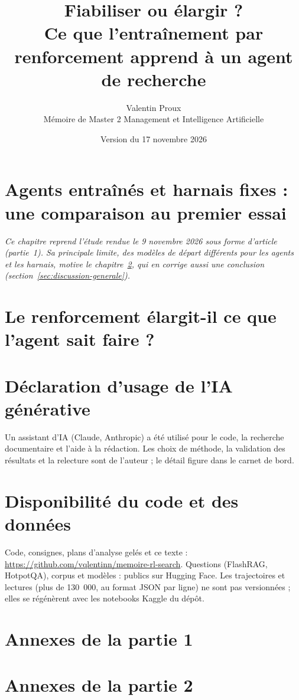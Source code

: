 \documentclass[11pt,a4paper]{report}
\title{\textbf{Fiabiliser ou élargir ?}\\[6pt]
\Large Ce que l'entraînement par renforcement apprend à un agent de recherche}
\author{Valentin Proux\\[4pt]\normalsize Mémoire de Master 2 Management et Intelligence Artificielle}
\date{Version du 17 novembre 2026}
\begin{document}
\maketitle



\tableofcontents



\chapter{Agents entraînés et harnais fixes : une comparaison au premier essai}\label{ch:partie1}
\noindent\emph{Ce chapitre reprend l'étude rendue le 9 novembre 2026 sous forme d'article (partie~1). Sa principale limite, des modèles de départ différents pour les agents et les harnais, motive le chapitre~\ref{ch:partie2}, qui en corrige aussi une conclusion (section~\ref{sec:discussion-generale}).}


\chapter{Le renforcement élargit-il ce que l'agent sait faire ?}\label{ch:partie2}






\chapter*{Déclaration d'usage de l'IA générative}
Un assistant d'IA (Claude, Anthropic) a été utilisé pour le code, la recherche documentaire et l'aide à la rédaction. Les choix de méthode, la validation des résultats et la relecture sont de l'auteur ; le détail figure dans le carnet de bord.

\chapter*{Disponibilité du code et des données}
Code, consignes, plans d'analyse gelés et ce texte : \url{https://github.com/vqlentinn/memoire-rl-search}. Questions (FlashRAG, HotpotQA), corpus et modèles : publics sur Hugging Face. Les trajectoires et lectures (plus de 130~000, au format JSON par ligne) ne sont pas versionnées ; elles se régénèrent avec les notebooks Kaggle du dépôt.




\appendix
\chapter{Annexes de la partie 1}


\chapter{Annexes de la partie 2}\label{ch:annexes2}

\end{document}
